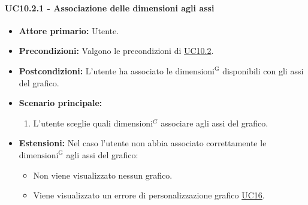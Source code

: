 \paragraph{UC10.2.1 - Associazione delle dimensioni agli assi}
\label{sec:UC10.2.1}
    \begin{itemize}
        \item \textbf{Attore primario:} Utente.
        \item \textbf{Precondizioni:} Valgono le precondizioni di \hyperref[sec:UC10.2]{UC10.2}.
	    \item \textbf{Postcondizioni:} L'utente ha associato le ${\mathrm{dimensioni^{G}}}$ disponibili con gli assi del grafico.
	    \item \textbf{Scenario principale:} 
	    \begin{enumerate}
	    		\item L'utente sceglie quali dimensioni$^{G}$ associare agli assi del grafico.
		\end{enumerate}
	    \item \textbf{Estensioni:} Nel caso l'utente non abbia associato correttamente le ${\mathrm{dimensioni^{G}}}$ agli assi del grafico:
              \begin{itemize}
                  \item Non viene visualizzato nessun grafico.
                  \item Viene visualizzato un errore di personalizzazione grafico \hyperref[sec:UC16 - Errore di personalizzazione]{UC16}.
              \end{itemize}
    \end{itemize}

\newpage

